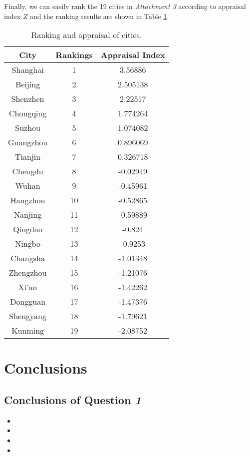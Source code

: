 \documentclass{apmcmthesis}
\begin{document}
Finally, we can easily rank the 19 cities in \textit{Attachment 3} according to appraisal index $Z$ and the ranking results are shown in Table \ref{city ranking}.
\begin{table}[h]
  \centering
  \footnotesize
  \caption{Ranking and appraisal of cities.}
    \begin{tabular}{ccc}
\midrule
    City  & Rankings & Appraisal Index \\
    \toprule
    Shanghai & 1     & 3.56886 \\
    Beijing & 2     & 2.505138 \\
    Shenzhen & 3     & 2.22517 \\
    Chongqing & 4     & 1.774264 \\
    Suzhou & 5     & 1.074082 \\
    Guangzhou & 6     & 0.896069 \\
    Tianjin & 7     & 0.326718 \\
    Chengdu & 8     & -0.02949 \\
    Wuhan & 9     & -0.45961 \\
    Hangzhou & 10    & -0.52865 \\
    Nanjing & 11    & -0.59889 \\
    Qingdao & 12    & -0.824 \\
    Ningbo & 13    & -0.9253 \\
    Changsha & 14    & -1.01348 \\
    Zhengzhou & 15    & -1.21076 \\
    Xi'an & 16    & -1.42262 \\
    Dongguan & 17    & -1.47376 \\
    Shengyang & 18    & -1.79621 \\
    Kunming & 19    & -2.08752 \\
    \bottomrule
    \end{tabular}%
  \label{city ranking}%
\end{table}%


\section{Conclusions}
\subsection{Conclusions of Question \textit 1}
\begin{itemize}
\item 	
\item
\item
\item
\end{itemize}	
\end{document}
